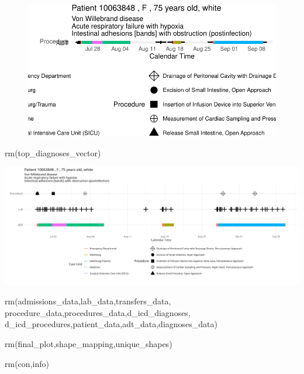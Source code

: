 \documentclass[
]{article}
\newenvironment{Shaded}{\begin{snugshade}}{\end{snugshade}}
\newcommand{\FunctionTok}[1]{\textcolor[rgb]{0.00,0.00,0.00}{#1}}
\newcommand{\NormalTok}[1]{\textcolor[rgb]{0.00,0.00,0.00}{#1}}
\begin{document}
\begin{figure}[H]

{\centering \includegraphics{hw3_files/figure-pdf/unnamed-chunk-6-1.pdf}

}

\end{figure}

\begin{Shaded}
\begin{Highlighting}[]
\FunctionTok{rm}\NormalTok{(top\_diagnoses\_vector)}
\end{Highlighting}
\end{Shaded}

\includegraphics{images/clipboard-2812213175.png}

\begin{Shaded}
\begin{Highlighting}[]
\FunctionTok{rm}\NormalTok{(admissions\_data,lab\_data,transfers\_data,}
\NormalTok{   procedure\_data,procedures\_data,d\_icd\_diagnoses,}
\NormalTok{   d\_icd\_procedures,patient\_data,adt\_data,diagnoses\_data)}

\FunctionTok{rm}\NormalTok{(final\_plot,shape\_mapping,unique\_shapes)}

\FunctionTok{rm}\NormalTok{(con,info)}
\end{Highlighting}
\end{Shaded}
\end{document}
